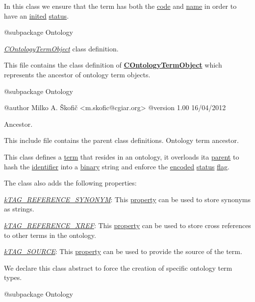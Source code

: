 In this class we ensure that the term has both the \hyperlink{}{code} and \hyperlink{}{name} in order to have an \hyperlink{}{inited} \hyperlink{}{status}.

\begin{DoxyVerb}    @subpackage     Ontology\end{DoxyVerb}


{\itshape \hyperlink{class_c_ontology_term_object}{C\-Ontology\-Term\-Object}} class definition.

This file contains the class definition of {\bfseries \hyperlink{class_c_ontology_term_object}{C\-Ontology\-Term\-Object}} which represents the ancestor of ontology term objects.

\begin{DoxyVerb}    @subpackage     Ontology

    @author         Milko A. Škofič <m.skofic@cgiar.org>
    @version        1.00 16/04/2012\end{DoxyVerb}


Ancestor.

This include file contains the parent class definitions. Ontology term ancestor.

This class defines a \hyperlink{class_c_term}{term} that resides in an ontology, it overloads ita \hyperlink{class_c_term}{parent} to hash the \hyperlink{}{identifier} into a \hyperlink{class_c_data_type_binary}{binary} string and enforce the \hyperlink{}{encoded} \hyperlink{}{status} \hyperlink{}{flag}.

The class also adds the following properties\-:


\begin{DoxyItemize}
\item {\itshape \hyperlink{}{k\-T\-A\-G\-\_\-\-R\-E\-F\-E\-R\-E\-N\-C\-E\-\_\-\-S\-Y\-N\-O\-N\-Y\-M}}\-: This \hyperlink{}{property} can be used to store synonyms as strings. 
\item {\itshape \hyperlink{}{k\-T\-A\-G\-\_\-\-R\-E\-F\-E\-R\-E\-N\-C\-E\-\_\-\-X\-R\-E\-F}}\-: This \hyperlink{}{property} can be used to store cross references to other terms in the ontology. 
\item {\itshape \hyperlink{}{k\-T\-A\-G\-\_\-\-S\-O\-U\-R\-C\-E}}\-: This \hyperlink{}{property} can be used to provide the source of the term. 
\end{DoxyItemize}

We declare this class abstract to force the creation of specific ontology term types.

\begin{DoxyVerb}    @subpackage     Ontology\end{DoxyVerb}


